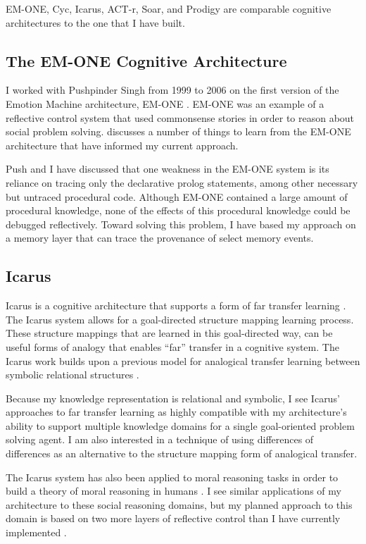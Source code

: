 EM-ONE, Cyc, Icarus, ACT-r, Soar, and Prodigy are comparable cognitive
architectures to the one that I have built.

\subsection{The EM-ONE Cognitive Architecture}

I worked with Pushpinder Singh from 1999 to 2006 on the first version
of the Emotion Machine architecture, EM-ONE \citep{singh:2005}.
EM-ONE was an example of a reflective control system that used
commonsense stories in order to reason about social problem solving.
\cite{morgan:2009} discusses a number of things to learn from the
EM-ONE architecture that have informed my current approach.

Push and I have discussed that one weakness in the EM-ONE system is
its reliance on tracing only the declarative prolog statements, among
other necessary but untraced procedural code.  Although EM-ONE
contained a large amount of procedural knowledge, none of the effects
of this procedural knowledge could be debugged reflectively.  Toward
solving this problem, I have based my approach on a memory layer that
can trace the provenance of select memory events.

\subsection{Icarus}

Icarus is a cognitive architecture that supports a form of far
transfer learning \citep{konik:2009}.  The Icarus system allows for a
goal-directed structure mapping learning process.  These structure
mappings that are learned in this goal-directed way, can be useful
forms of analogy that enables ``far'' transfer in a cognitive system.
The Icarus work builds upon a previous model for analogical transfer
learning between symbolic relational structures \citep{gentner:1983}.

Because my knowledge representation is relational and symbolic, I see
Icarus' approaches to far transfer learning as highly compatible with
my architecture's ability to support multiple knowledge domains for a
single goal-oriented problem solving agent.  I am also interested in a
technique of using differences of differences \citep{winston:1970} as
an alternative to the structure mapping form of analogical transfer.

The Icarus system has also been applied to moral reasoning tasks in
order to build a theory of moral reasoning in humans \citep{iba:2011}.
I see similar applications of my architecture to these social
reasoning domains, but my planned approach to this domain is based on
two more layers of reflective control than I have currently
implemented \citep{morgan:2011}.

